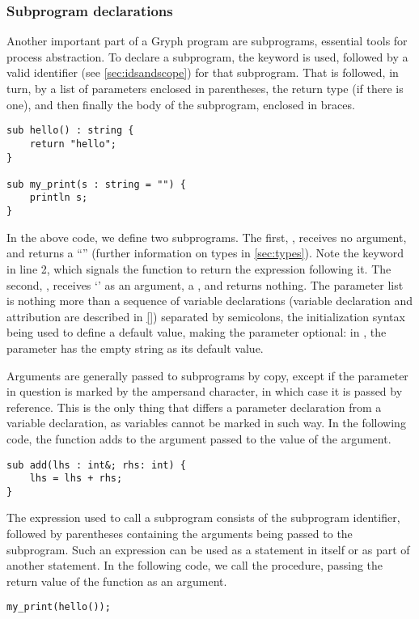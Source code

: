\subsubsection{Subprogram declarations}
\label{sec:subprogram}
Another important part of a Gryph program are subprograms, essential tools for process abstraction. To declare a subprogram, the  keyword is used, followed by a valid identifier (see \ref{sec:idsandscope}) for that subprogram. That is followed, in turn, by a list of parameters enclosed in parentheses, the return type (if there is one), and then finally the body of the subprogram, enclosed in braces.
\begin{lstlisting}[language=Gryph]
sub hello() : string {
	return "hello";
}

sub my_print(s : string = "") {
	println s;
}
\end{lstlisting}
In the above code, we define two subprograms. The first, , receives no argument, and returns a ``'' (further information on types in \ref{sec:types}). Note the  keyword in line 2, which signals the function to return the expression following it. The second, , receives `' as an argument, a , and returns nothing. 
The parameter list is nothing more than a sequence of variable declarations (variable declaration and attribution are described in \ref{}) separated by semicolons, the initialization syntax being used to define a default value, making the parameter optional: in , the parameter  has the empty string as its default value.

Arguments are generally passed to subprograms by copy, except if the parameter in question is marked by the ampersand character, in which case it is passed by reference. This is the only thing that differs a parameter declaration from a variable declaration, as variables cannot be marked in such way. In the following code, the function  adds to the argument passed to  the value of the  argument.
\begin{lstlisting}[language=Gryph]
sub add(lhs : int&; rhs: int) {
	lhs = lhs + rhs;
}
\end{lstlisting}

The expression used to call a subprogram consists of the subprogram identifier, followed by parentheses containing the arguments being passed to the subprogram. Such an expression can be used as a statement in itself or as part of another statement. In the following code, we call the  procedure, passing the return value of the  function as an argument.
\begin{lstlisting}[language=Gryph]
my_print(hello());
\end{lstlisting}

